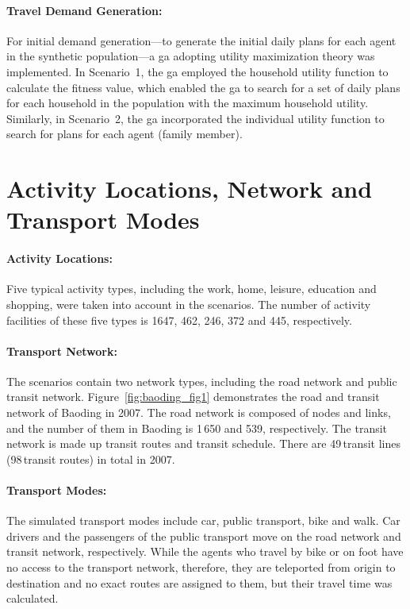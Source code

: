 \paragraph{Travel Demand Generation:} For initial demand generation---\ie to generate the initial daily plans for each agent in the synthetic population---a \gls{ga} adopting utility maximization theory was implemented. 
In Scenario~1, the \gls{ga} employed the household utility function to calculate the fitness value, which enabled the \gls{ga} to search for a set of daily plans for each household in the population with the maximum household utility. 
Similarly, in Scenario~2, the \gls{ga} incorporated the individual utility function to search for plans for each agent (family member). 

\section{Activity Locations, Network and Transport Modes}
\paragraph{Activity Locations:} Five typical activity types, including the work, home, leisure, education and shopping, were taken into account in the scenarios. 
The number of activity facilities of these five types is 1647, 462, 246, 372 and 445, respectively. 

\paragraph{Transport Network:} The scenarios contain two network types, including the road network and public transit network. 
Figure~\ref{fig:baoding_fig1} demonstrates the road and transit network of Baoding in 2007. The road network is composed of nodes and links, and the number of them in Baoding is 1\,650 and 539, respectively. 
The transit network is made up transit routes and transit schedule. There are 49\,transit lines (98\,transit routes) in total in 2007. 

\paragraph{Transport Modes:} The simulated transport modes include car, public transport, bike and walk. Car drivers and the passengers of the public transport move on the road network and transit network, respectively. While the agents who travel by bike or on foot have no access to the transport network, therefore, they are teleported from origin to destination and no exact routes are assigned to them, but their travel time was calculated. 

